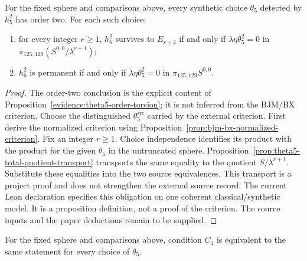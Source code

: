 \begin{theorem}
  \label{thm:bjm-bx-criterion-any-choice}
  \notready
  For the fixed sphere and comparisons above, every synthetic choice $\theta_5$
  detected by $h_5^2$ has order two.  For each such choice:
  \begin{enumerate}
    \item for every integer $r\ge1$, $h_6^2$ survives to $E_{r+3}$ if and
      only if $\lambda\eta\theta_5^2=0$ in
      $\pi_{125,129}(S^{0,0}/\lambda^{r+1})$;
    \item $h_6^2$ is permanent if and only if
      $\lambda\eta\theta_5^2=0$ in $\pi_{125,129}S^{0,0}$.
  \end{enumerate}
\end{theorem}

\begin{proof}
  The order-two conclusion is the explicit content of
  Proposition~\ref{evidence:theta5-order-torsion}; it is not inferred from the
  BJM/BX criterion.  Choose the distinguished $\theta_5^{\mathrm{src}}$ carried by the external
  criterion. First derive the normalized criterion using
  Proposition~\ref{prop:bjm-bx-normalized-criterion}. Fix an integer $r\ge1$.  Choice independence identifies its
  product with the product for the given $\theta_5$ in the untruncated sphere.
  Proposition~\ref{prop:theta5-total-quotient-transport} transports the
  same equality to the quotient $S/\lambda^{r+1}$.  Substitute these equalities into the two source
  equivalences.  This transport is a project proof and does not strengthen the
  external source record. The current Lean declaration specifies this obligation on one coherent
  classical/synthetic model. It is a proposition definition, not a proof of
  the criterion. The source inputs and the paper deductions remain to be supplied.
\end{proof}

\begin{lemma}
  \label{lem:near126-equiv-c4}
  \notready
  For the fixed sphere and comparisons above, condition $C_4$ is equivalent to the
  same statement for every choice of $\theta_5$.
\end{lemma}


